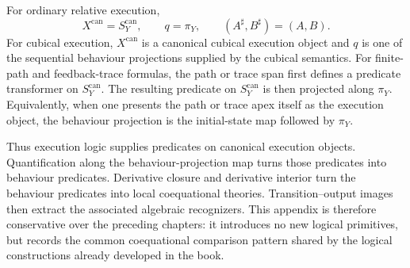 For ordinary relative execution,
\[
  X^{\mathrm{can}}=S^{\mathrm{can}}_Y,
  \qquad
  q=\pi_Y,
  \qquad
  (A^\sharp,B^\sharp)=(A,B).
\]
For cubical execution, \(X^{\mathrm{can}}\) is a canonical cubical execution
object and \(q\) is one of the sequential behaviour projections supplied by
the cubical semantics.  For finite-path and feedback-trace formulas, the
path or trace span first defines a predicate transformer on
\(S^{\mathrm{can}}_Y\).  The resulting predicate on
\(S^{\mathrm{can}}_Y\) is then projected along \(\pi_Y\).  Equivalently, when
one presents the path or trace apex itself as the execution object, the
behaviour projection is the initial-state map followed by \(\pi_Y\).

Thus execution logic supplies predicates on canonical execution objects.
Quantification along the behaviour-projection map turns those predicates into
behaviour predicates.  Derivative closure and derivative interior turn the
behaviour predicates into local coequational theories.  Transition--output
images then extract the associated algebraic recognizers.  This appendix is
therefore conservative over the preceding chapters: it introduces no new
logical primitives, but records the common coequational comparison pattern
shared by the logical constructions already developed in the book.